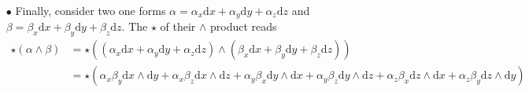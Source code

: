 \documentclass[10pt, a4paper]{article}
\begin{document}
{\begin{enumerate}
\begin{enumerate}
    \begin{align*}
      &\text{d}\star \alpha =  \text{d}(\alpha_x \text{d}y \wedge \text{d}z + \alpha_y \text{d}z \wedge \text{d}y + \alpha_z \text{d}x \wedge \text{d}y)\\
      &= (\partial_x \alpha_x \text{d}x + \partial_y \alpha_x \text{d}y + \partial_z \alpha_x \text{d}z) \wedge \text{d}y \wedge \text{d}z + (\partial_x \alpha_y \text{d}x + \partial_y \alpha_y \text{d}y + \partial_z \alpha_y \text{d}z) \wedge \text{d}z \wedge \text{d}x +  (\partial_x \alpha_z \text{d}x + \partial_y \alpha_z \text{d}y + \partial_z \alpha_z \text{d}z) \wedge \text{d}x \wedge \text{d}y\\
      &= \partial_x \alpha_x \text{d}x \wedge \text{d}y \wedge \text{d}z + \partial_y \alpha_y \text{d}y \wedge \text{d}z \wedge \text{d}x + \partial_z \alpha_z \text{d}z \wedge \text{d}x \wedge \text{d}y = (\partial_x \alpha_x + \partial_y \alpha_y + \partial_z \alpha_z)\text{d}x \wedge \text{d}y \wedge \text{d}z.
    \end{align*}
    Now using the fact $\star$ is an involution in our space (see previous $\bullet$), we have $1 = \star\star 1= \star \sqrt{\text{det}(\delta_{ij})} \text{d}x \wedge \text{d}y \wedge \text{d}z = \star \text{d}x \wedge \text{d}y \wedge \text{d}z$ leading to 
    \begin{align*}
      \star \text{d}\star \alpha = \star (\partial_x \alpha_x + \partial_y \alpha_y + \partial_z \alpha_z)\text{d}x \wedge \text{d}y \wedge \text{d}z = \partial_x \alpha_x + \partial_y \alpha_y + \partial_z \alpha_z
    \end{align*}
    which is directly the scalar result obtained when taking the divergence $\nabla \cdot \alpha^{\sharp}$. 
    \item[$\bullet$] Finally, consider two one forms $\alpha = \alpha_x \text{d}x + \alpha_y \text{d}y + \alpha_z \text{d}z$ and $\beta = \beta_x \text{d}x + \beta_y \text{d}y + \beta_z \text{d}z$. The $\star$ of their $\wedge$ product reads 
    \begin{align*}
      \star (\alpha \wedge \beta) &= \star((\alpha_x \text{d}x + \alpha_y \text{d}y + \alpha_z \text{d}z) \wedge (\beta_x \text{d}x + \beta_y \text{d}y + \beta_z \text{d}z))\\
      &= \star(\alpha_x \beta_y \text{d}x\wedge\text{d}y + \alpha_x \beta_z \text{d}x\wedge\text{d}z + \alpha_y \beta_x \text{d}y\wedge\text{d}x + \alpha_y \beta_z \text{d}y\wedge\text{d}z + \alpha_z \beta_x \text{d}z\wedge\text{d}x + \alpha_z\beta_y \text{d}z\wedge\text{d}y)\\

\end{align*}
\end{enumerate}
\end{enumerate}}
\end{document}
